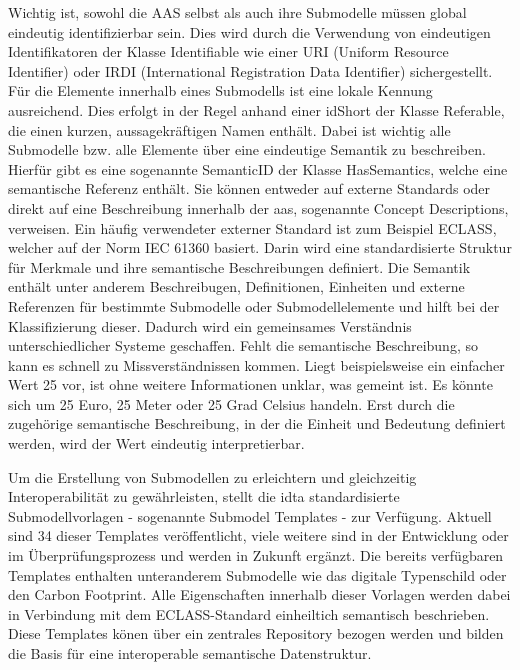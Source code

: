 Wichtig ist, sowohl die AAS selbst als auch ihre Submodelle müssen global eindeutig identifizierbar sein.
Dies wird durch die Verwendung von eindeutigen Identifikatoren der Klasse Identifiable wie einer URI (Uniform Resource Identifier) oder IRDI (International Registration Data Identifier) sichergestellt.
Für die Elemente innerhalb eines Submodells ist eine lokale Kennung ausreichend. Dies erfolgt in der Regel anhand einer idShort der Klasse Referable, die einen kurzen, aussagekräftigen Namen enthält.
Dabei ist wichtig alle Submodelle bzw. alle Elemente über eine eindeutige Semantik zu beschreiben.
Hierfür gibt es eine sogenannte SemanticID der Klasse HasSemantics, welche eine semantische Referenz enthält.
Sie können entweder auf externe Standards oder direkt auf eine Beschreibung innerhalb der \acs{aas}, sogenannte Concept Descriptions, verweisen.
Ein häufig verwendeter externer Standard ist zum Beispiel ECLASS, welcher auf der Norm IEC 61360 \cite{ECLASSIEC61360} basiert.
Darin wird eine standardisierte Struktur für Merkmale und ihre semantische Beschreibungen definiert.
Die Semantik enthält unter anderem Beschreibugen, Definitionen, Einheiten und externe Referenzen für bestimmte Submodelle oder Submodellelemente und hilft bei der Klassifizierung dieser.
Dadurch wird ein gemeinsames Verständnis unterschiedlicher Systeme geschaffen.
Fehlt die semantische Beschreibung, so kann es schnell zu Missverständnissen kommen.
Liegt beispielsweise ein einfacher Wert 25 vor, ist ohne weitere Informationen unklar, was gemeint ist. 
Es könnte sich um 25 Euro, 25 Meter oder 25 Grad Celsius handeln.
Erst durch die zugehörige semantische Beschreibung, in der die Einheit und Bedeutung definiert werden, wird der Wert eindeutig interpretierbar. 


Um die Erstellung von Submodellen zu erleichtern und gleichzeitig Interoperabilität zu gewährleisten, stellt die \acs{idta} standardisierte Submodellvorlagen - sogenannte Submodel Templates - zur Verfügung.
Aktuell sind 34 dieser Templates veröffentlicht, viele weitere sind in der Entwicklung oder im Überprüfungsprozess und werden in Zukunft ergänzt.
Die bereits verfügbaren Templates enthalten unteranderem Submodelle wie das digitale Typenschild oder den Carbon Footprint.
Alle Eigenschaften innerhalb dieser Vorlagen werden dabei in Verbindung mit dem ECLASS-Standard einheiltich semantisch beschrieben.
Diese Templates könen über ein zentrales Repository bezogen werden und bilden die Basis für eine interoperable semantische Datenstruktur.

